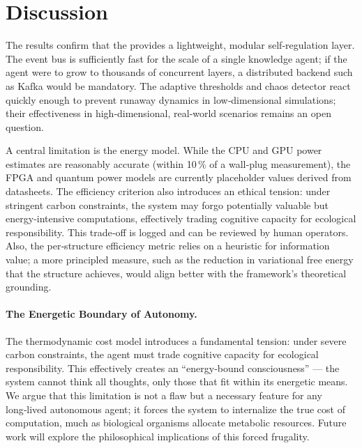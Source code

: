 \section{Discussion}

The results confirm that the \Core{} provides a lightweight, modular
self‑regulation layer.  The event bus is sufficiently fast for the
scale of a single knowledge agent; if the agent were to grow to
thousands of concurrent layers, a distributed backend such as Kafka
would be mandatory.  The adaptive thresholds and chaos detector react
quickly enough to prevent runaway dynamics in low‑dimensional
simulations; their effectiveness in high‑dimensional, real‑world
scenarios remains an open question.

A central limitation is the energy model.  While the CPU and GPU power
estimates are reasonably accurate (within 10\,\% of a wall‑plug
measurement), the FPGA and quantum power models are currently
placeholder values derived from datasheets.  The efficiency criterion also introduces an ethical tension: under
stringent carbon constraints, the system may forgo potentially valuable
but energy‑intensive computations, effectively trading cognitive
capacity for ecological responsibility.  This trade‑off is logged and
can be reviewed by human operators. Also, the per‑structure
efficiency metric relies on a heuristic for information value; a more
principled measure, such as the reduction in variational free energy
that the structure achieves, would align better with the \Apeiron{}
framework’s theoretical grounding.

\paragraph{The Energetic Boundary of Autonomy.}
The thermodynamic cost model introduces a fundamental tension: under severe carbon 
constraints, the agent must trade cognitive capacity for ecological responsibility.  
This effectively creates an “energy‑bound consciousness” — the system cannot think 
all thoughts, only those that fit within its energetic means.  
We argue that this limitation is not a flaw but a necessary feature for any 
long‑lived autonomous agent; it forces the system to internalize the true cost of 
computation, much as biological organisms allocate metabolic resources.  
Future work will explore the philosophical implications of this forced frugality.

